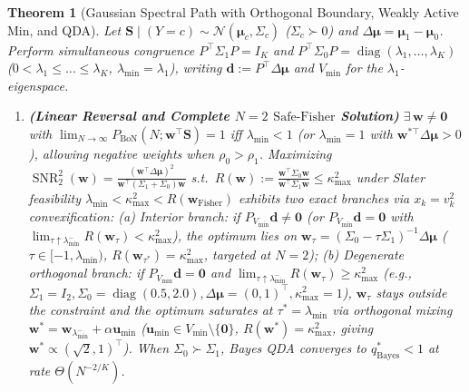 \documentclass{article}
\theoremstyle{plain}
\newtheorem{theorem}{Theorem}
\theoremstyle{definition}
\theoremstyle{remark}
\newcommand{\SNR}{\operatorname{SNR}}
\begin{document}
\begin{theorem}[Gaussian Spectral Path with Orthogonal Boundary, Weakly Active $\mathrm{Min}$, and QDA]
\label{thm:gaussian-ensemble}
Let $\mathbf{S} \mid (Y = c) \sim \mathcal{N}(\boldsymbol{\mu}_c, \Sigma_c)$ ($\Sigma_c \succ 0$) and $\Delta\boldsymbol{\mu} = \boldsymbol{\mu}_1 - \boldsymbol{\mu}_0$. Perform simultaneous congruence $P^\top\Sigma_1 P = I_K$ and $P^\top\Sigma_0 P = \operatorname{diag}(\lambda_1,\dots,\lambda_K)$ ($0 < \lambda_1 \le \dots \le \lambda_K$, $\lambda_{\min} = \lambda_1$), writing $\mathbf{d} := P^\top\Delta\boldsymbol{\mu}$ and $V_{\min}$ for the $\lambda_1$-eigenspace.
\begin{enumerate}[leftmargin=1.6em,itemsep=2pt,topsep=1pt]
    \item \textbf{(Linear Reversal and Complete $N=2$ $\mathrm{Safe\text{-}Fisher}$ Solution)} $\exists\,\mathbf{w} \neq \mathbf{0}$ with $\lim_{N\to\infty} P_{\mathrm{BoN}}(N; \mathbf{w}^\top\mathbf{S}) = 1$ iff $\lambda_{\min} < 1$ (or $\lambda_{\min} = 1$ with $\mathbf{w}^{*\top}\Delta\boldsymbol{\mu} > 0$), allowing negative weights when $\rho_0 > \rho_1$. Maximizing $\SNR_2^2(\mathbf{w}) = \frac{(\mathbf{w}^\top\Delta\boldsymbol{\mu})^2}{\mathbf{w}^\top(\Sigma_1+\Sigma_0)\mathbf{w}}$ s.t.\ $R(\mathbf{w}) := \frac{\mathbf{w}^\top\Sigma_0\mathbf{w}}{\mathbf{w}^\top\Sigma_1\mathbf{w}} \le \kappa_{\max}^2$ under Slater feasibility $\lambda_{\min} < \kappa_{\max}^2 < R(\mathbf{w}_{\mathrm{Fisher}})$ exhibits two exact branches via $x_k = v_k^2$ convexification: \emph{(a) Interior branch:} if $P_{V_{\min}}\mathbf{d} \neq \mathbf{0}$ (or $P_{V_{\min}}\mathbf{d} = \mathbf{0}$ with $\lim_{\tau \uparrow \lambda_{\min}^-} R(\mathbf{w}_\tau) < \kappa_{\max}^2$), the optimum lies on $\mathbf{w}_\tau = (\Sigma_0 - \tau\Sigma_1)^{-1}\Delta\boldsymbol{\mu}$ ($\tau \in [-1, \lambda_{\min})$, $R(\mathbf{w}_{\tau^*}) = \kappa_{\max}^2$, targeted at $N=2$); \emph{(b) Degenerate orthogonal branch:} if $P_{V_{\min}}\mathbf{d} = \mathbf{0}$ and $\lim_{\tau \uparrow \lambda_{\min}^-} R(\mathbf{w}_\tau) \ge \kappa_{\max}^2$ (e.g., $\Sigma_1 = I_2, \Sigma_0 = \operatorname{diag}(0.5, 2.0), \Delta\boldsymbol{\mu} = (0,1)^\top, \kappa_{\max}^2 = 1$), $\mathbf{w}_\tau$ stays outside the constraint and the optimum saturates at $\tau^* = \lambda_{\min}$ via orthogonal mixing $\mathbf{w}^* = \mathbf{w}_{\lambda_{\min}^-} + \alpha\mathbf{u}_{\min}$ ($\mathbf{u}_{\min} \in V_{\min}\setminus\{\mathbf{0}\}$, $R(\mathbf{w}^*) = \kappa_{\max}^2$, giving $\mathbf{w}^* \propto (\sqrt{2}, 1)^\top$). When $\Sigma_0 \succ \Sigma_1$, Bayes QDA converges to $q^*_{\mathrm{Bayes}} < 1$ at rate $\Theta(N^{-2/K})$.

\end{enumerate}
\end{theorem}
\end{document}
